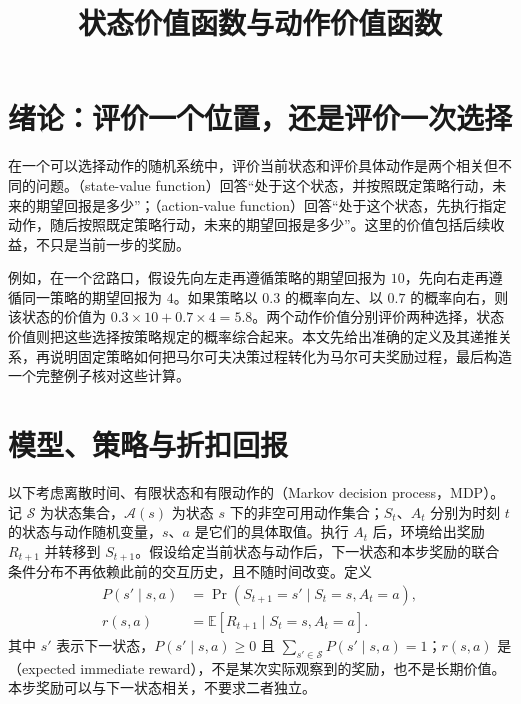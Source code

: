 \documentclass[UTF8]{ctexart}
\title{状态价值函数与动作价值函数}
\author{}
\date{}
\begin{document}
\maketitle

\section{绪论：评价一个位置，还是评价一次选择}
\label{sec:value-intro}

在一个可以选择动作的随机系统中，评价当前状态和评价具体动作是两个相关但不同的问题。（state-value function）回答“处于这个状态，并按照既定策略行动，未来的期望回报是多少”；（action-value function）回答“处于这个状态，先执行指定动作，随后按照既定策略行动，未来的期望回报是多少”。这里的价值包括后续收益，不只是当前一步的奖励。

例如，在一个岔路口，假设先向左走再遵循策略的期望回报为 $10$，先向右走再遵循同一策略的期望回报为 $4$。如果策略以 $0.3$ 的概率向左、以 $0.7$ 的概率向右，则该状态的价值为 $0.3\times10+0.7\times4=5.8$。两个动作价值分别评价两种选择，状态价值则把这些选择按策略规定的概率综合起来。本文先给出准确的定义及其递推关系，再说明固定策略如何把马尔可夫决策过程转化为马尔可夫奖励过程，最后构造一个完整例子核对这些计算。

\section{模型、策略与折扣回报}
\label{sec:value-model}

以下考虑离散时间、有限状态和有限动作的（Markov decision process，MDP）。记 $\mathcal S$ 为状态集合，$\mathcal A(s)$ 为状态 $s$ 下的非空可用动作集合；$S_t$、$A_t$ 分别为时刻 $t$ 的状态与动作随机变量，$s$、$a$ 是它们的具体取值。执行 $A_t$ 后，环境给出奖励 $R_{t+1}$ 并转移到 $S_{t+1}$。假设给定当前状态与动作后，下一状态和本步奖励的联合条件分布不再依赖此前的交互历史，且不随时间改变。定义
\begin{equation}
  \begin{aligned}
    P(s'\mid s,a)&=\Pr(S_{t+1}=s'\mid S_t=s,A_t=a),\\
    r(s,a)&=\mathbb E[R_{t+1}\mid S_t=s,A_t=a].
  \end{aligned}
  \label{eq:value-model}
\end{equation}
其中 $s'$ 表示下一状态，$P(s'\mid s,a)\geq0$ 且 $\sum_{s'\in\mathcal S}P(s'\mid s,a)=1$；$r(s,a)$ 是（expected immediate reward），不是某次实际观察到的奖励，也不是长期价值。本步奖励可以与下一状态相关，不要求二者独立。
\end{document}
